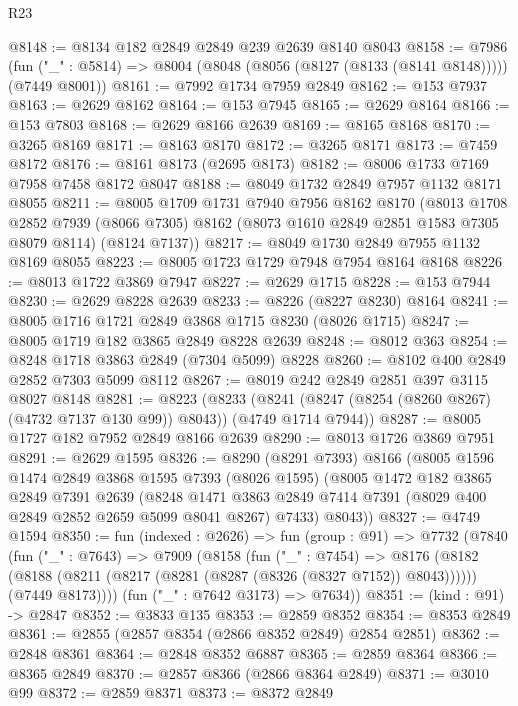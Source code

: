 \begin{lexlean}{R23}
\begin{coremodule}
@8148 := @8134 @182 @2849 @2849 @239 @2639 @8140 @8043
@8158 := @7986
    (fun ("_" : @5814) => @8004 (@8048 (@8056 (@8127 (@8133 (@8141 @8148))))) (@7449 @8001))
@8161 := @7992 @1734 @7959 @2849
@8162 := @153 @7937
@8163 := @2629 @8162
@8164 := @153 @7945
@8165 := @2629 @8164
@8166 := @153 @7803
@8168 := @2629 @8166 @2639
@8169 := @8165 @8168
@8170 := @3265 @8169
@8171 := @8163 @8170
@8172 := @3265 @8171
@8173 := @7459 @8172
@8176 := @8161 @8173 (@2695 @8173)
@8182 := @8006 @1733 @7169 @7958 @7458 @8172 @8047
@8188 := @8049 @1732 @2849 @7957 @1132 @8171 @8055
@8211 := @8005
    @1709
    @1731
    @7940
    @7956
    @8162
    @8170
    (@8013
      @1708
      @2852
      @7939
      (@8066 @7305)
      @8162
      (@8073 @1610 @2849 @2851 @1583 @7305 @8079 @8114)
      (@8124 @7137))
@8217 := @8049 @1730 @2849 @7955 @1132 @8169 @8055
@8223 := @8005 @1723 @1729 @7948 @7954 @8164 @8168
@8226 := @8013 @1722 @3869 @7947
@8227 := @2629 @1715
@8228 := @153 @7944
@8230 := @2629 @8228 @2639
@8233 := @8226 (@8227 @8230) @8164
@8241 := @8005 @1716 @1721 @2849 @3868 @1715 @8230 (@8026 @1715)
@8247 := @8005 @1719 @182 @3865 @2849 @8228 @2639
@8248 := @8012 @363
@8254 := @8248 @1718 @3863 @2849 (@7304 @5099) @8228
@8260 := @8102 @400 @2849 @2852 @7303 @5099 @8112
@8267 := @8019 @242 @2849 @2851 @397 @3115 @8027 @8148
@8281 := @8223
    (@8233 (@8241 (@8247 (@8254 (@8260 @8267) (@4732 @7137 @130 @99)) @8043)) (@4749 @1714 @7944))
@8287 := @8005 @1727 @182 @7952 @2849 @8166 @2639
@8290 := @8013 @1726 @3869 @7951
@8291 := @2629 @1595
@8326 := @8290
    (@8291 @7393)
    @8166
    (@8005
      @1596
      @1474
      @2849
      @3868
      @1595
      @7393
      (@8026 @1595)
      (@8005
        @1472
        @182
        @3865
        @2849
        @7391
        @2639
        (@8248 @1471 @3863 @2849 @7414 @7391 (@8029 @400 @2849 @2852 @2659 @5099 @8041 @8267) @7433)
        @8043))
@8327 := @4749 @1594
@8350 := fun (indexed : @2626) =>
  fun (group : @91) =>
  @7732
    (@7840
      (fun ("_" : @7643) =>
      @7909
        (@8158
          (fun ("_" : @7454) =>
          @8176
            (@8182 (@8188 (@8211 (@8217 (@8281 (@8287 (@8326 (@8327 @7152)) @8043))))))
            (@7449 @8173))))
      (fun ("_" : @7642 @3173) => @7634))
@8351 := (kind : @91) -> @2847
@8352 := @3833 @135
@8353 := @2859 @8352
@8354 := @8353 @2849
@8361 := @2855 (@2857 @8354 (@2866 @8352 @2849) @2854 @2851)
@8362 := @2848 @8361
@8364 := @2848 @8352 @6887
@8365 := @2859 @8364
@8366 := @8365 @2849
@8370 := @2857 @8366 (@2866 @8364 @2849)
@8371 := @3010 @99
@8372 := @2859 @8371
@8373 := @8372 @2849

\end{coremodule}
\end{lexlean}
